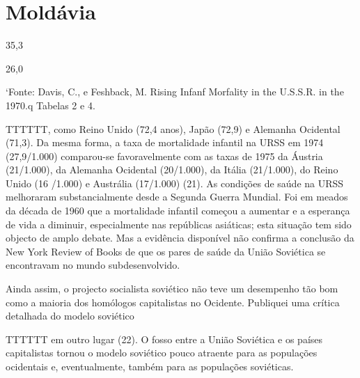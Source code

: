 {{{\section{Moldávia}
 \par 
35,3
 \par 
26,0
 \par 
‘Fonte: Davis, C., e Feshback, M. Rising Infanf Morfality in the U.S.S.R. in the 1970.q Tabelas {\color{blue}2} e {\color{blue}4}.
 \par 
TTTTTT, como Reino Unido (72,4 anos), Japão (72,9) e Alemanha Ocidental (71,3). Da mesma forma, a taxa de mortalidade infantil na URSS em 1974 (27,9/1.{\color{blue}000}) comparou-se favoravelmente com as taxas de 1975 da Áustria (21/1.{\color{blue}000}), da Alemanha Ocidental (20/1.{\color{blue}000}), da Itália (21/1.{\color{blue}000}), do Reino Unido (16 /1.{\color{blue}000}) e Austrália (17/1.{\color{blue}000}) (21). As condições de saúde na URSS melhoraram substancialmente desde a Segunda Guerra Mundial. Foi em meados da década de 1960 que a mortalidade infantil começou a aumentar e a esperança de vida a diminuir, especialmente nas repúblicas asiáticas; esta situação tem sido objecto de amplo debate. Mas a evidência disponível não confirma a conclusão da New York Review of Books de que os pares de saúde da União Soviética se encontravam no mundo subdesenvolvido.
 \par 
Ainda assim, o projecto socialista soviético não teve um desempenho tão bom como a maioria dos homólogos capitalistas no Ocidente. Publiquei uma crítica detalhada do modelo soviético
 \par 
TTTTTT em outro lugar (22). O fosso entre a União Soviética e os países capitalistas tornou o modelo soviético pouco atraente para as populações ocidentais e, eventualmente, também para as populações soviéticas.
 \par 
}}}
